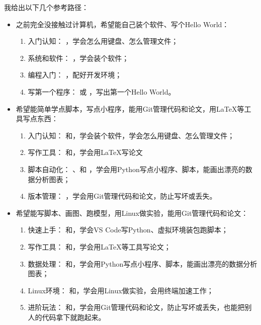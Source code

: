 我给出以下几个参考路径：
\begin{itemize}
  \item 之前完全没接触过计算机，希望能自己装个软件、写个Hello World：
  \begin{enumerate}
    \item 入门认知：  ，学会怎么用键盘、怎么管理文件；
    \item 系统和软件：  ，学会装个软件；
    \item 编程入门：  ，配好开发环境；
    \item 写第一个程序：  或  ，写出第一个Hello World。
  \end{enumerate}
  \item 希望能简单学点脚本，写点小程序，能用Git管理代码和论文，用LaTeX等工具写点东西：
  \begin{enumerate}
    \item 入门认知：  和，学会装个软件，学会怎么用键盘、怎么管理文件；
    \item 写作工具：  和，学会用LaTeX写论文
    \item 脚本自动化：  、和  ，学会用Python写点小程序、脚本，能画出漂亮的数据分析图表；
    \item 版本管理：  ，学会用Git管理代码和论文，防止写坏或丢失。
  \end{enumerate}
  \item 希望能写脚本、画图、跑模型，用Linux做实验，能用Git管理代码和论文：
  \begin{enumerate}
    \item 快速上手：  和，学会VS Code写Python、虚拟环境装包跑脚本；
    \item 写作工具：  和，学会用LaTeX等工具写论文；
    \item 数据处理：  和，学会用Python写点小程序、脚本，能画出漂亮的数据分析图表；
    \item Linux环境：  和，学会用Linux做实验，会用终端加速工作；
    \item 进阶玩法：  和，学会用Git管理代码和论文，防止写坏或丢失，也能把别人的代码拿下就跑起来。

\end{enumerate}
\end{itemize}
